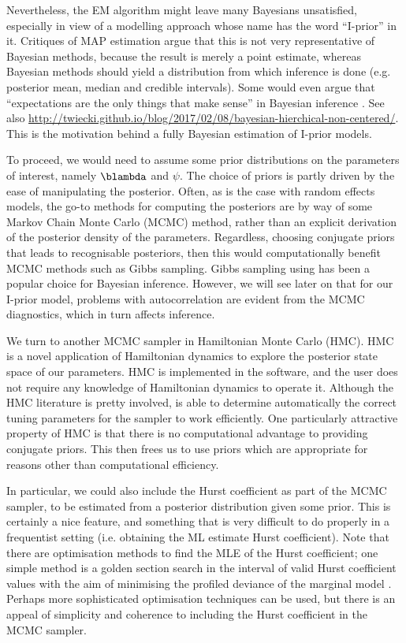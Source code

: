 \documentclass[english, 11pt]{article}
\begin{document}
Nevertheless, the EM algorithm might leave many Bayesians unsatisfied, especially in view of a modelling approach whose name has the word ``I-prior'' in it. 
Critiques of MAP estimation argue that this is not very representative of Bayesian methods, because the result is merely a point estimate, whereas Bayesian methods should yield a distribution from which inference is done (e.g. posterior mean, median and credible intervals).
Some would even argue that ``expectations are the only things that make sense'' in Bayesian inference \citep{betancourt2017conceptual}.
See also \url{http://twiecki.github.io/blog/2017/02/08/bayesian-hierchical-non-centered/}.
This is the motivation behind a fully Bayesian estimation of I-prior models.


To proceed, we would need to assume some prior distributions on the parameters of interest, namely $\blambda$ and  $\psi$. 
The choice of priors is partly driven by the ease of manipulating the posterior. 
Often, as is the case with random effects models, the go-to methods for computing the posteriors are by way of some Markov Chain Monte Carlo (MCMC) method, rather than an explicit derivation of the posterior density of the parameters.
Regardless, choosing conjugate priors that leads to recognisable posteriors, then this would computationally benefit MCMC methods such as Gibbs sampling.
Gibbs sampling using  has been a popular choice for Bayesian inference. 
However, we will see later on that for our I-prior model, problems with autocorrelation are evident from the MCMC diagnostics, which in turn affects inference.


We turn to another MCMC sampler in Hamiltonian Monte Carlo (HMC).
HMC is a novel application of Hamiltonian dynamics to explore the posterior state space of our parameters.
HMC is implemented in the  software, and the user does not require any knowledge of Hamiltonian dynamics to operate it. 
Although the HMC literature is pretty involved,  is able to determine automatically the correct tuning parameters for the sampler to work efficiently.
One particularly attractive property of HMC is that there is no computational advantage to providing conjugate priors. 
This then frees us to use priors which are appropriate for reasons other than computational efficiency.


In particular, we could also include the Hurst coefficient as part of the MCMC sampler, to be estimated from a posterior distribution given some prior. 
This is certainly a nice feature, and something that is very difficult to do properly in a frequentist setting (i.e. obtaining the ML estimate Hurst coefficient). 
Note that there are optimisation methods to find the MLE of the Hurst coefficient; one simple method is a golden section search in the interval of valid Hurst coefficient values with the aim of minimising the profiled deviance of the marginal model \citep{jamil2017}.
Perhaps more sophisticated optimisation techniques can be used, but there is an appeal of simplicity and coherence to including the Hurst coefficient in the MCMC sampler.
\end{document}
